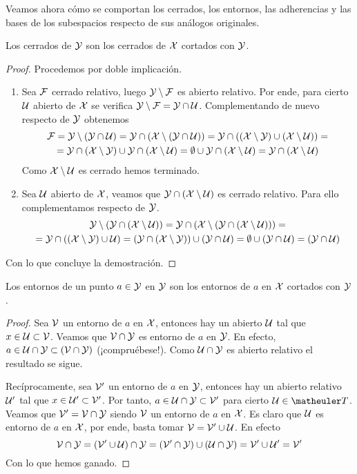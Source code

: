 Veamos ahora cómo se comportan los cerrados, los entornos, las adherencias y las bases de los subespacios respecto de sus análogos originales.
\begin{lem}
	Los cerrados de $\mathcal{Y}$ son los cerrados de $\mathcal{X}$ cortados con $\mathcal{Y}$.
	
	\begin{proof} Procedemos por doble implicación.
		\begin{enumerate}
			\item[\bra] Sea $\mathcal{F}$ cerrado relativo, luego $\mathcal{Y}\setminus \mathcal{F}$ es abierto relativo. Por ende, para cierto $\mathcal{U}$ abierto de $\mathcal{X}$ se verifica $\mathcal{Y}\setminus \mathcal{F}=\mathcal{Y}\cap\mathcal{U}$. Complementando de nuevo respecto de $\mathcal{Y}$ obtenemos
			\begin{multline*}
				\mathcal{F} = \mathcal{Y}\setminus(\mathcal{Y}\cap\mathcal{U})=\mathcal{Y}\cap(\mathcal{X}\setminus(\mathcal{Y}\cap\mathcal{U}))=\mathcal{Y}\cap((\mathcal{X}\setminus\mathcal{Y})\cup(\mathcal{X}\setminus\mathcal{U}))=\\
				=\mathcal{Y}\cap(\mathcal{X}\setminus\mathcal{Y})\cup\mathcal{Y}\cap(\mathcal{X}\setminus\mathcal{U})=\emptyset\cup\mathcal{Y}\cap(\mathcal{X}\setminus\mathcal{U})=\mathcal{Y}\cap(\mathcal{X}\setminus\mathcal{U})
			\end{multline*}
			Como $\mathcal{X}\setminus\mathcal{U}$ es cerrado hemos terminado.
			\item[\bla] Sea $\mathcal{U}$ abierto de $\mathcal{X}$, veamos que $\mathcal{Y}\cap(\mathcal{X} \setminus\mathcal{U})$ es cerrado relativo. Para ello complementamos respecto de $\mathcal{Y}$.
			\begin{multline*}
				\mathcal{Y}\setminus(\mathcal{Y}\cap(\mathcal{X} \setminus\mathcal{U}))=\mathcal{Y}\cap(\mathcal{X} \setminus (\mathcal{Y}\cap(\mathcal{X} \setminus \mathcal{U})))=\\
				=\mathcal{Y}\cap((\mathcal{X}\setminus\mathcal{Y})\cup\mathcal{U})=(\mathcal{Y}\cap(\mathcal{X}\setminus\mathcal{Y}))\cup(\mathcal{Y}\cap\mathcal{U})=\emptyset\cup(\mathcal{Y}\cap\mathcal{U})=(\mathcal{Y}\cap\mathcal{U})
			\end{multline*}
		\end{enumerate}
		Con lo que concluye la demostración.
	\end{proof}
\end{lem}
\begin{lem}
	Los entornos de un punto $a \in \mathcal{Y}$ en $\mathcal{Y}$ son los entornos de $a$ en $\mathcal{X}$ cortados con $\mathcal{Y}$.	
\end{lem}
\begin{proof}
	Sea $\mathcal{V}$ un entorno de $a$ en $\mathcal{X}$, entonces hay un abierto $\mathcal{U}$ tal que $x \in \mathcal{U} \subset \mathcal{V}$. Veamos que $\mathcal{V} \cap \mathcal{Y}$ es entorno de $a$ en $\mathcal{Y}$. En efecto, $a \in \mathcal{U} \cap \mathcal{Y}\subset (\mathcal{V} \cap \mathcal{Y})$ (¡compruébese!). Como $\mathcal{U}\cap\mathcal{Y}$ es abierto relativo el resultado se sigue.
	
	Recíprocamente, sea $\mathcal{V}'$ un entorno de $a$ en $\mathcal{Y}$, entonces hay un abierto relativo $\mathcal{U}'$ tal que $x \in \mathcal{U}' \subset \mathcal{V}'$. Por tanto, $a \in \mathcal{U} \cap \mathcal{Y} \subset \mathcal{V}'$ para cierto $\U\in\T$. Veamos que $\mathcal{V}' = \mathcal{V} \cap \mathcal{Y}$ siendo $\mathcal{V}$ un entorno de $a$ en $\mathcal{X}$. Es claro que $\mathcal{U}$ es entorno de $a$ en $\mathcal{X}$, por ende, basta tomar $\mathcal{V} = \mathcal{V}' \cup \mathcal{U}$. En efecto
	\begin{equation*}
		\mathcal{V}\cap\mathcal{Y}=(\mathcal{V}'\cup\mathcal{U})\cap\mathcal{Y}=(\mathcal{V}'\cap\mathcal{Y})\cup(\mathcal{U}\cap\mathcal{Y})=\mathcal{V}'\cup\mathcal{U}'=\mathcal{V}'
	\end{equation*}
	Con lo que hemos ganado.
\end{proof}
